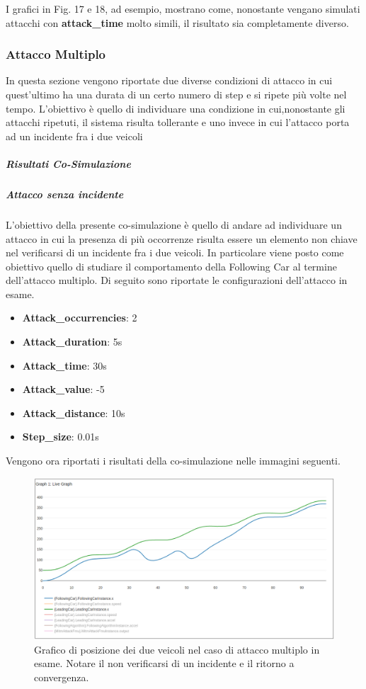 I grafici in Fig. 17 e 18, ad esempio, mostrano come, nonostante vengano simulati attacchi con \textbf{attack\_time} molto simili, il risultato sia completamente diverso.
\subsubsection{Attacco Multiplo}
In questa sezione vengono riportate due diverse condizioni di attacco in cui quest'ultimo ha una durata di un certo numero di step e si ripete più volte nel tempo. L'obiettivo è quello di individuare una condizione in cui,nonostante gli attacchi ripetuti, il sistema risulta tollerante e uno invece in cui l'attacco porta ad un incidente fra i due veicoli
\subparagraph{Risultati Co-Simulazione}
\subparagraph{Attacco senza incidente}
L'obiettivo della presente co-simulazione è quello di andare ad individuare un attacco in cui la presenza di più occorrenze risulta essere un elemento non chiave nel verificarsi di un incidente fra i due veicoli. In particolare viene posto come obiettivo quello di studiare il comportamento della Following Car al termine dell'attacco multiplo. Di seguito sono riportate le configurazioni dell'attacco in esame.
\begin{itemize}
	\item \textbf{Attack\_occurrencies}: 2
	\item \textbf{Attack\_duration}: 5s
	\item \textbf{Attack\_time}: 30s
	\item \textbf{Attack\_value}: -5
	\item \textbf{Attack\_distance}: 10s
	\item \textbf{Step\_size}: 0.01s
\end{itemize}
Vengono ora riportati i risultati della co-simulazione nelle immagini seguenti.

\begin{figure}[H]
	\centering
	\includegraphics[width=\textwidth]{img/MultiAttackAccelPlotXNoCrash.png}
	\caption{Grafico di posizione dei due veicoli nel caso di attacco multiplo in esame. Notare il non verificarsi di un incidente e il ritorno a convergenza.}
\end{figure}

